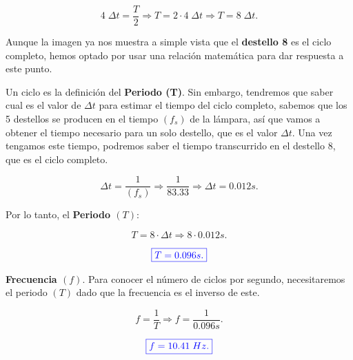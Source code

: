 \documentclass[a4paper,12pt]{article} %
\begin{document}
\[4 \; \Delta t = \frac{T}{2} \Rightarrow T = 2 \cdot 4 \; \Delta t \Rightarrow T = 8 \; \Delta t.\]

\vspace{\baselineskip}

\begin{justify}
    Aunque la imagen ya nos muestra a simple vista que el \textbf{destello 8} es el ciclo completo, hemos optado por usar una relación
    matemática para dar respuesta a este punto.
\end{justify}

\newpage 

\begin{justify}
    Un ciclo es la definición del \textbf{Periodo (T)}. Sin embargo, tendremos que saber cual es el valor de \(\Delta t\) para estimar el tiempo del ciclo completo, sabemos que
    los 5 destellos se producen en el tiempo \((f_s)\) de la lámpara, así que vamos a obtener el tiempo necesario para un solo destello, que es el valor \(\Delta t\).
    Una vez tengamos este tiempo, podremos saber el tiempo transcurrido en el destello 8, que es el ciclo completo. 
\end{justify}

\[\Delta t = \frac{1}{(f_s)} \Rightarrow \frac{1}{83.33} \Rightarrow \Delta t = 0.012s.\]

\vspace{\baselineskip}

\begin{justify}
    Por lo tanto, el \textbf{Periodo \((T)\)}:
\end{justify}

\[ T = 8 \cdot \Delta t \Rightarrow 8 \cdot 0.012s. \]

\[ \textcolor{blue}{\boxed{T = 0.096 s.}} \]

\vspace{\baselineskip} 

\begin{justify}
    \textbf{Frecuencia \((f)\)}. Para conocer el número de ciclos por segundo, necesitaremos el periodo \((T)\) dado que la frecuencia es el inverso de este.

\end{justify}

\[ f = \frac{1}{T} \Rightarrow f = \frac{1}{0.096s}.\]

\[ \textcolor{blue}{\boxed{f = 10.41 \; Hz.}}\]

\vspace{\baselineskip} 
\end{document}
